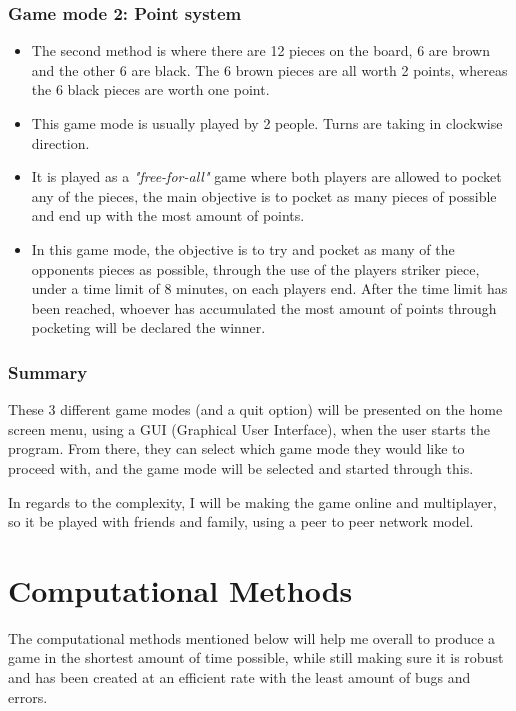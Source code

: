 \documentclass[11pt,a4paper]{report}
\begin{document}
\subsubsection{Game mode 2: Point system}
\begin{itemize}
    \item The second method is where there are 12 pieces on the board, 6 are brown and the other 6 are black. The 6 brown pieces are all worth 2 points, whereas the 6 black pieces are worth one point.
    \item This game mode is usually played by 2 people. Turns are taking in clockwise direction.
    \item It is played as a \textit{"free-for-all"} game where both players are allowed to pocket any of the pieces, the main objective is to pocket as many pieces of possible and end up with the most amount of points.
    \item In this game mode, the objective is to try and pocket as many of the opponents pieces as possible, through the use of the players striker piece, under a time limit of 8 minutes, on each players end. After the time limit has been reached, whoever has accumulated the most amount of points through pocketing will be declared the winner.
\end{itemize}

\subsubsection{Summary}
\noindent These 3 different game modes (and a quit option) will be presented on the home screen menu, using a GUI (Graphical User Interface), when the user starts the program. From there, they can select which game mode they would like to proceed with, and the game mode will be selected and started through this. \newline

\noindent In regards to the complexity, I will be making the game online and multiplayer, so it be played with friends and family, using a peer to peer network model.

\section{Computational Methods}
The computational methods mentioned below will help me overall to produce a game in the shortest amount of time possible, while still making sure it is robust and has been created at an efficient rate with the least amount of bugs and errors.
\end{document}
